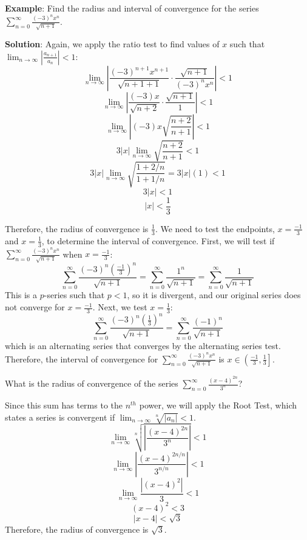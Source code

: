 \textbf{Example}: Find the radius and interval of convergence for the series 
$\sum_{n=0}^\infty \frac{(-3)^n x^n}{\sqrt{n + 1}}$.

\textbf{Solution}: Again, we apply the ratio test to find values of $x$ such 
that $\lim_{n \to \infty} \left| \frac{a_{n + 1}}{a_n} \right| < 1$:
$$\lim_{n \to \infty} \left| \frac{(-3)^{n + 1} x^{n + 1}}{\sqrt{n + 1 + 1}} 
\cdot \frac{\sqrt{n + 1}}{(-3)^n x^n} \right| < 1$$
$$\lim_{n \to \infty} \left| \frac{(-3) x}{\sqrt{n + 2}} \cdot \frac{\sqrt{n + 
1}}{1} \right| < 1$$
$$\lim_{n \to \infty} \left| (-3)x \sqrt{\frac{n + 2}{n + 1}} \right| < 1$$
$$3|x| \lim_{n \to \infty} \sqrt{\frac{n + 2}{n + 1}} < 1$$
$$3|x| \lim_{n \to \infty} \sqrt{\frac{1 + 2/n}{1 + 1/n}} = 3|x|(1) < 1$$
$$3|x| < 1$$
$$|x| < \frac{1}{3}$$

Therefore, the radius of convergence is $\frac{1}{3}$. We need to test the 
endpoints, $x = \frac{-1}{3}$ and $x = \frac{1}{3}$, to determine the interval 
of convergence. First, we will test if $\sum_{n=0}^\infty \frac{(-3)^n x^n}{
\sqrt{n + 1}}$ when $x = \frac{-1}{3}$:
$$\sum_{n=0}^\infty \frac{(-3)^n \left( \frac{-1}{3} \right)^n}{\sqrt{n + 1}} 
= \sum_{n = 0}^\infty \frac{1^n}{\sqrt{n + 1}} = \sum_{n = 0}^\infty \frac{1}{
\sqrt{n + 1}}$$
This is a $p$-series such that $ p < 1$, so it is divergent, and our original 
series does not converge for $x = \frac{-1}{3}$. Next, we test $x = \frac{1}{3}$:
$$\sum_{n=0}^\infty \frac{(-3)^n \left( \frac{1}{3} \right)^n}{\sqrt{n + 1}} = 
\sum_{n = 0}^\infty \frac{(-1)^n}{\sqrt{n + 1}}$$
which is an alternating series that converges by the alternating series test. 
Therefore, the interval of convergence for $\sum_{n=0}^\infty \frac{(-3)^n x^n}
{\sqrt{n + 1}}$ is $x \in \left( \frac{-1}{3}, \frac{1}{3} \right]$. 

\begin{Exercise} What is the radius of convergence 
of the series $\sum_{n=0}^\infty \frac{(x - 4)^{2n}}{3^n}$?
\end{Exercise}

\begin{Answer}[ref = radconv1]
Since this sum has terms to the $n^{th}$ power, we will apply the Root Test, 
which states a series is convergent if $\lim_{n \to \infty} \sqrt[n]{\left| 
a_n \right|} < 1$. 
$$\lim_{n \to \infty} \sqrt[n]{\left| \frac{(x - 4)^{2n}}{3^n} \right|} < 1$$
$$\lim_{n \to \infty} \left| \frac{(x - 4) ^ {2n/n}}{3^{n/n}} \right| < 1$$
$$\lim_{n \to \infty} \frac{\left| (x-4)^2 \right|}{3} < 1$$
$$(x - 4)^2 < 3$$
$$\left| x - 4 \right| < \sqrt{3}$$
Therefore, the radius of convergence is $\sqrt{3}$. 
\end{Answer}


